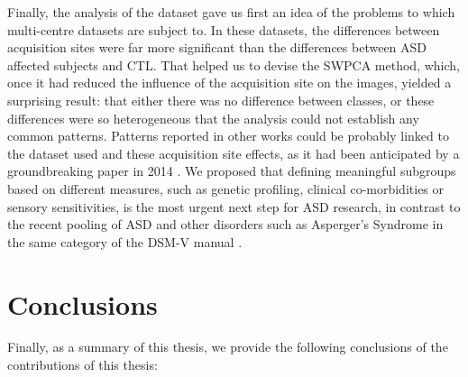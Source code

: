 Finally, the analysis of the \aimsmri{} dataset gave us first an idea of the problems to which multi-centre datasets are subject to. In these datasets, the differences between acquisition sites were far more significant than the differences between \ac{ASD} affected subjects and \ac{CTL}. That helped us to devise the \ac{SWPCA} method, which, once it had reduced the influence of the acquisition site on the images, yielded a surprising result: that either there was no difference between classes, or these differences were so heterogeneous that the analysis could not establish any common patterns. Patterns reported in other works could be probably linked to the dataset used and these acquisition site effects, as it had been anticipated by a groundbreaking paper in 2014 \cite{haar2014anatomical}. We proposed that defining meaningful subgroups based on different measures, such as genetic profiling, clinical co-morbidities or sensory sensitivities, is the most urgent next step for \ac{ASD} research, in contrast to the recent pooling of \ac{ASD} and other disorders such as Asperger's Syndrome in the same category of the DSM-V manual \cite{Association2013}. 


\newpage
\section{Conclusions}
Finally, as a summary of this thesis, we provide the following conclusions of the contributions of this thesis: 

